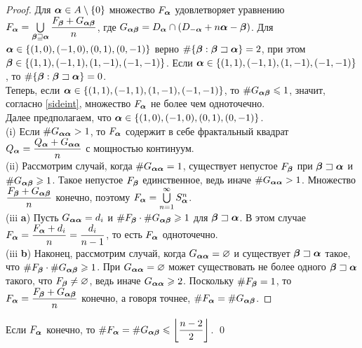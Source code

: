 \begin{proof}
Для ${\bm{\alpha}}\in A\setminus\{0\}$ множество $F_{\bm{\alpha}}$ удовлетворяет уравнению
$F_{\bm{\alpha}}=\bigcup\limits_{{\bm{\beta}}\sqsupseteq{\bm{\alpha}}} \dfrac{F_{\bm{\beta}}+G_{{\bm{\alpha}}{\bm{\beta}}}}{n}$, 
где $G_{{\bm{\alpha}}{\bm{\beta}}}=D_{\bm{\alpha}}\cap(D_{-{\bm{\alpha}}}+n{\bm{\alpha}}-{\bm{\beta}})$.
Для ${\bm{\alpha}}\in\{(1,0), (-1,0), (0,1), (0,-1)\}$ верно $\#\{{\bm{\beta}}:{\bm{\beta}}\sqsupset{\bm{\alpha}}\}=2$, при этом ${\bm{\beta}}\in\{(1,1), (-1,1), (1,-1), (-1,-1)\}$.
Если ${\bm{\alpha}}\in\{(1,1), (-1,1), (1,-1), (-1,-1)\}$, то $\#\{{\bm{\beta}}:{\bm{\beta}}\sqsupset{\bm{\alpha}}\}=0$.\\

Теперь, если ${\bm{\alpha}}\in\{(1,1), (-1,1), (1,-1), (-1,-1)\}$, то $\#G_{{\bm{\alpha}}{\bm{\beta}}}\leqslant1$, значит, согласно \ref{sideint}, множество $F_{\bm{\alpha}}$ не более чем одноточечно.\\

Далее предполагаем, что ${\bm{\alpha}}\in\{(1,0), (-1,0), (0,1), (0,-1)\}$.\\

(i) Если $\#G_{{\bm{\alpha}}{\bm{\alpha}}}> 1$, то $F_{\bm{\alpha}}$ содержит в себе фрактальный квадрат $Q_{\bm{\alpha}}=\dfrac{Q_{\bm{\alpha}}+G_{{\bm{\alpha}}{\bm{\alpha}}}}{n}$ с мощностью континуум.\\

(ii) Рассмотрим случай, когда $\#G_{{\bm{\alpha}}{\bm{\alpha}}}=1$, существует непустое $F_{\bm{\beta}}$ при ${\bm{\beta}}\sqsupset{\bm{\alpha}}$ и $\#G_{{\bm{\alpha}}{\bm{\beta}}}\geqslant1$. 
Такое непустое $F_{\bm{\beta}}$ единственное, ведь иначе $\#G_{{\bm{\alpha}}{\bm{\alpha}}}>1$.
Множество $\dfrac{F_{\bm{\beta}}+G_{{\bm{\alpha}}{\bm{\beta}}}}{n}$ конечно, поэтому $F_{\bm{\alpha}}=\bigcup\limits_{n=1}^\infty S_{\bm{\alpha}}^n$.\\

(iii {\bf a}) Пусть $G_{{\bm{\alpha}}{\bm{\alpha}}}=d_i$ и $\#F_{\bm{\beta}}\cdot\#G_{{\bm{\alpha}}{\bm{\beta}}}\geqslant1$ для ${\bm{\beta}}\sqsupset{\bm{\alpha}}$.
В этом случае $F_{\bm{\alpha}}=\dfrac{F_{\bm{\alpha}}+d_i}{n}=\dfrac{d_i}{n-1}$, то есть $F_{\bm{\alpha}}$ одноточечно.\\

(iii {\bf b}) Наконец, рассмотрим случай, когда $G_{{\bm{\alpha}}{\bm{\alpha}}}=\varnothing$ и существует ${\bm{\beta}}\sqsupset{\bm{\alpha}}$ такое, что $\#F_{\bm{\beta}}\cdot\#G_{{\bm{\alpha}}{\bm{\beta}}}\geqslant1$.
При $G_{{\bm{\alpha}}{\bm{\alpha}}}=\varnothing$ может существовать не более одного ${\bm{\beta}}\sqsupset{\bm{\alpha}}$ такого, что $F_{\bm{\beta}}\neq\varnothing$, ведь иначе $G_{{\bm{\alpha}}{\bm{\alpha}}}\geqslant2$.
Поскольку $\#F_{\bm{\beta}}=1$, то $F_{\bm{\alpha}}=\dfrac{F_{\bm{\beta}}+G_{{\bm{\alpha}}{\bm{\beta}}}}{n}$ конечно, а говоря точнее, $\#F_{\bm{\alpha}}=\#G_{{\bm{\alpha}}{\bm{\beta}}}$.
\end{proof}

\begin{corollary}\label{onepoint} 
Если $F_{\bm{\alpha}}$ конечно, то  $\#F_{\bm{\alpha}}=\#G_{{\bm{\alpha}}{\bm{\beta}}}\leqslant\left\lfloor\dfrac{n-2}{2}\right\rfloor$.
\hfill\qed
\end{corollary}

